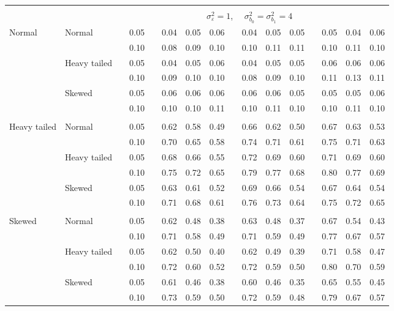 \documentclass{article} %
\begin{document}
\begin{table}[ht]
\begin{scriptsize}
\begin{center}
\begin{tabular}{ll p{.1cm} c p{.1cm} rrr p{.1cm} rrr p{.1cm} rrr}
&&&&&&&&&&&&&&&\\
& && && \multicolumn{9}{c}{$\sigma_{\varepsilon}^2 = 1$, \ \ $\sigma_{b_0}^2 = \sigma_{b_1}^2 = 4$} \\ \cline{6-16}
\rowcolor{gray!20}Normal       & Normal       && 0.05 &&   0.04 & 0.05 & 0.06 && 0.04 & 0.05 & 0.05 &&   0.05 & 0.04 & 0.06 \\
\rowcolor{gray!20}             &              && 0.10 &&   0.08 & 0.09 & 0.10 && 0.10 & 0.11 & 0.11 &&   0.10 & 0.11 & 0.10 \\
\rowcolor{gray!20}             & Heavy tailed && 0.05 &&   0.04 & 0.05 & 0.06 && 0.04 & 0.05 & 0.05 &&   0.06 & 0.06 & 0.06 \\
\rowcolor{gray!20}             &              && 0.10 &&   0.09 & 0.10 & 0.10 && 0.08 & 0.09 & 0.10 &&   0.11 & 0.13 & 0.11 \\
\rowcolor{gray!20}             & Skewed       && 0.05 &&   0.06 & 0.06 & 0.06 && 0.06 & 0.06 & 0.05 &&   0.05 & 0.05 & 0.06 \\
\rowcolor{gray!20}             &              && 0.10 &&   0.10 & 0.10 & 0.11 && 0.10 & 0.11 & 0.10 &&   0.10 & 0.11 & 0.10 \\
             &&&&&&&&&&&&&&&\\
Heavy tailed & Normal       && 0.05 &&   0.62 & 0.58 & 0.49 && 0.66 & 0.62 & 0.50 && 0.67 & 0.63 & 0.53 \\  
             &              && 0.10 &&   0.70 & 0.65 & 0.58 && 0.74 & 0.71 & 0.61 && 0.75 & 0.71 & 0.63 \\  
             & Heavy tailed && 0.05 &&   0.68 & 0.66 & 0.55 && 0.72 & 0.69 & 0.60 && 0.71 & 0.69 & 0.60 \\  
             &              && 0.10 &&   0.75 & 0.72 & 0.65 && 0.79 & 0.77 & 0.68 && 0.80 & 0.77 & 0.69 \\  
             & Skewed       && 0.05 &&   0.63 & 0.61 & 0.52 && 0.69 & 0.66 & 0.54 && 0.67 & 0.64 & 0.54 \\  
             &              && 0.10 &&   0.71 & 0.68 & 0.61 && 0.76 & 0.73 & 0.64 && 0.75 & 0.72 & 0.65 \\  
             &&&&&&&&&&&&&&&\\
Skewed       & Normal       && 0.05 &&   0.62 & 0.48 & 0.38 && 0.63 & 0.48 & 0.37 && 0.67 & 0.54 & 0.43 \\ 
             &              && 0.10 &&   0.71 & 0.58 & 0.49 && 0.71 & 0.59 & 0.49 && 0.77 & 0.67 & 0.57 \\ 
             & Heavy tailed && 0.05 &&   0.62 & 0.50 & 0.40 && 0.62 & 0.49 & 0.39 && 0.71 & 0.58 & 0.47 \\ 
             &              && 0.10 &&   0.72 & 0.60 & 0.52 && 0.72 & 0.59 & 0.50 && 0.80 & 0.70 & 0.59 \\ 
             & Skewed       && 0.05 &&   0.61 & 0.46 & 0.38 && 0.60 & 0.46 & 0.35 && 0.65 & 0.55 & 0.45 \\ 
             &              && 0.10 &&   0.73 & 0.59 & 0.50 && 0.72 & 0.59 & 0.48 && 0.79 & 0.67 & 0.57 \\ 



\end{tabular}
\end{center}
\end{scriptsize}
\end{table}
\end{document}
